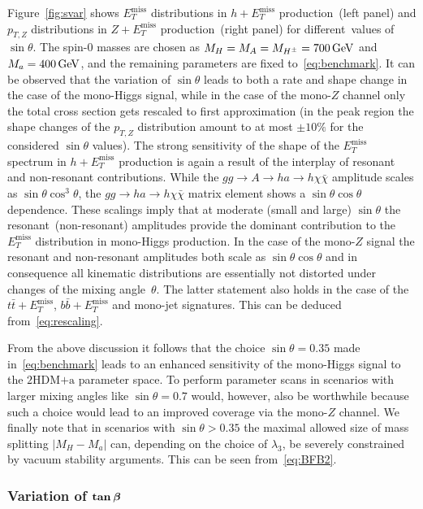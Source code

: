 \documentclass[a4paper, 11pt,notoc]{article}
\newcommand{\MET}{\ensuremath{E_T^\mathrm{miss}}\xspace}
\newcommand{\mA}{\ensuremath{M_{A}}\xspace}
\newcommand{\ma}{\ensuremath{M_{a}}\xspace}
\newcommand{\mH}{\ensuremath{M_{H}}\xspace}
\newcommand{\mHc}{\ensuremath{M_{H^{\pm}}}\xspace}
\newcommand{\hdma}{\ensuremath{\textrm{2HDM+a}}\xspace}
\def\bm#1{\mbox{\boldmath$#1$\unboldmath}}
\begin{document}
Figure~\ref{fig:svar} shows $\MET$ distributions in $h + \MET$ production~(left panel) and $p_{T,Z}$ distributions in $Z+\MET$ production~(right panel) for different~values of $\sin \theta$. The spin-0 masses are chosen as $\mH = \mA = \mHc = 700 \, {\rm GeV}$ and $\ma = 400 \, {\rm GeV}$, and the remaining parameters are fixed to~\eqref{eq:benchmark}. It can be observed that the variation of $\sin \theta$ leads to both a rate and shape change in the case of the mono-Higgs signal, while in the case of the mono-$Z$ channel only the total cross section gets rescaled to first approximation (in the peak region the shape changes of the $p_{T,Z}$ distribution amount to at most $\pm 10\%$ for the considered $\sin \theta$ values). The strong sensitivity of the shape of the $\MET$ spectrum in $h + \MET$ production is again a result of the interplay of resonant and non-resonant contributions. While the $gg \to A \to h a \to h \chi \bar \chi$  amplitude scales as $\sin \theta \cos^3 \theta$, the $gg \to h a  \to h \chi \bar \chi$ matrix element shows a $\sin \theta \cos \theta$ dependence. These scalings imply that at moderate  (small and large) $\sin \theta$ the resonant~(non-resonant) amplitudes provide the dominant contribution to the $\MET$ distribution in mono-Higgs production.  In the case of the mono-$Z$ signal the resonant and non-resonant amplitudes both scale as $\sin \theta \cos \theta$ and in consequence  all kinematic distributions are essentially not distorted  under changes of the mixing angle~$\theta$. The latter statement also holds in the case of the $t \bar t +\MET$, $b \bar b + \MET$ and mono-jet signatures.  This can be deduced from~\eqref{eq:rescaling}. 

From the above discussion it follows that the choice $\sin \theta = 0.35$ made in~\eqref{eq:benchmark} leads to an enhanced sensitivity of the mono-Higgs signal to the \hdma parameter space. To perform parameter scans in scenarios with larger mixing angles like $\sin \theta = 0.7$ would, however, also be worthwhile because such a choice would lead to an improved coverage via the mono-$Z$ channel. We finally note that in scenarios with $\sin \theta >0.35$ the maximal allowed size of mass splitting $|M_H - M_a|$ can, depending on the choice of $\lambda_3$, be severely constrained by vacuum stability arguments. This can be seen from~\eqref{eq:BFB2}. 

\subsubsection[Variation of $\tan \beta$]{Variation of $\bm{\tan \beta}$}
\end{document}
